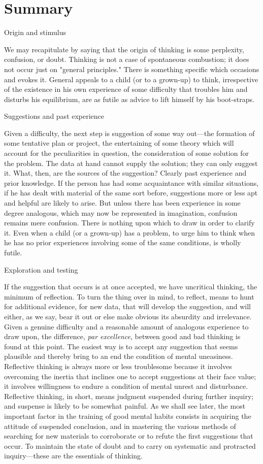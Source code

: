\documentclass[letterpaper]{book}
\begin{document}
\section{Summary}

Origin and stimulus

We may recapitulate by saying that the origin of thinking is some
perplexity, confusion, or doubt. Thinking is not a case of spontaneous
combustion; it does not occur just on "general principles." There is
something specific which occasions and evokes it. General appeals to a
child (or to a grown-up) to think, irrespective of the existence in his
own experience of some difficulty that troubles him and disturbs his
equilibrium, are as futile as advice to lift himself by his boot-straps.

Suggestions and past experience

Given a difficulty, the next step is suggestion of some way out---the
formation of some tentative plan or project, the entertaining of some
theory which will account for the peculiarities in question, the
consideration of some solution for the problem. The data at hand cannot
supply the solution; they can only suggest it. What, then, are the
sources of the suggestion? Clearly past experience and prior knowledge.
If the person has had some acquaintance with similar situations, if he
has dealt with material of the same sort before, suggestions more or
less apt and helpful are likely to arise. But unless there has been
experience in some degree analogous, which may now be represented in
imagination, confusion remains mere confusion. There is nothing upon
which to draw in order to clarify it. Even when a child (or a grown-up)
has a problem, to urge him to think when he has no prior experiences
involving some of the same conditions, is wholly
futile.

Exploration and testing

If the suggestion that occurs is at once accepted, we have uncritical
thinking, the minimum of reflection. To turn the thing over in mind, to
reflect, means to hunt for additional evidence, for new data, that will
develop the suggestion, and will either, as we say, bear it out or else
make obvious its absurdity and irrelevance. Given a genuine difficulty
and a reasonable amount of analogous experience to draw upon, the
difference, \emph{par excellence}, between good and bad thinking is
found at this point. The easiest way is to accept any suggestion that
seems plausible and thereby bring to an end the condition of mental
uneasiness. Reflective thinking is always more or less troublesome
because it involves overcoming the inertia that inclines one to accept
suggestions at their face value; it involves willingness to endure a
condition of mental unrest and disturbance. Reflective thinking, in
short, means judgment suspended during further inquiry; and suspense is
likely to be somewhat painful. As we shall see later, the most important
factor in the training of good mental habits consists in acquiring the
attitude of suspended conclusion, and in mastering the various methods
of searching for new materials to corroborate or to refute the first
suggestions that occur. To maintain the state of doubt and to carry on
systematic and protracted inquiry---these are the essentials of
thinking.
\end{document}
